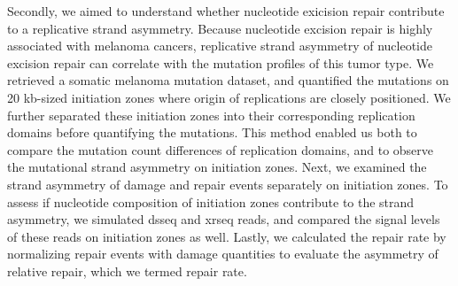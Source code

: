 Secondly, we aimed to understand whether nucleotide exicision repair contribute to a replicative strand asymmetry. Because nucleotide excision repair is highly associated with melanoma cancers, replicative strand asymmetry of nucleotide excision repair can correlate with the mutation profiles of this tumor type. We retrieved a somatic melanoma mutation dataset, and quantified the mutations on 20 \gls{kb}-sized initiation zones where origin of replications are closely positioned. We further separated these initiation zones into their corresponding replication domains before quantifying the mutations. This method enabled us both to compare the mutation count differences of replication domains, and to observe the mutational strand asymmetry on initiation zones. Next, we examined the strand asymmetry of damage and repair events separately on initiation zones. To assess if nucleotide composition of initiation zones contribute to the strand asymmetry, we simulated \gls{dsseq} and \gls{xrseq} reads, and compared the signal levels of these reads on initiation zones as well. Lastly, we calculated the repair rate by normalizing repair events with damage quantities to evaluate the asymmetry of relative repair, which we termed repair rate.